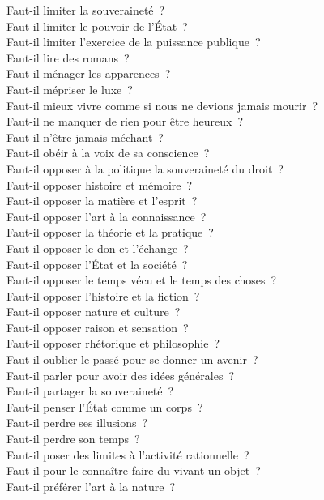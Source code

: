 \documentclass[a4paper,12pt]{article}
\begin{document}
Faut-il limiter la souveraineté ? \\
Faut-il limiter le pouvoir de l'État ? \\
Faut-il limiter l'exercice de la puissance publique ? \\
Faut-il lire des romans ? \\
Faut-il ménager les apparences ? \\
Faut-il mépriser le luxe ? \\
Faut-il mieux vivre comme si nous ne devions jamais mourir ? \\
Faut-il ne manquer de rien pour être heureux ? \\
Faut-il n'être jamais méchant ? \\
Faut-il obéir à la voix de sa conscience ? \\
Faut-il opposer à la politique la souveraineté du droit ? \\
Faut-il opposer histoire et mémoire ? \\
Faut-il opposer la matière et l'esprit ? \\
Faut-il opposer l'art à la connaissance ? \\
Faut-il opposer la théorie et la pratique ? \\
Faut-il opposer le don et l'échange ? \\
Faut-il opposer l'État et la société ? \\
Faut-il opposer le temps vécu et le temps des choses ? \\
Faut-il opposer l'histoire et la fiction ? \\
Faut-il opposer nature et culture ? \\
Faut-il opposer raison et sensation ? \\
Faut-il opposer rhétorique et philosophie ? \\
Faut-il oublier le passé pour se donner un avenir ? \\
Faut-il parler pour avoir des idées générales ? \\
Faut-il partager la souveraineté ? \\
Faut-il penser l'État comme un corps ? \\
Faut-il perdre ses illusions ? \\
Faut-il perdre son temps ? \\
Faut-il poser des limites à l'activité rationnelle ? \\
Faut-il pour le connaître faire du vivant un objet ? \\
Faut-il préférer l'art à la nature ? \\
\end{document}

